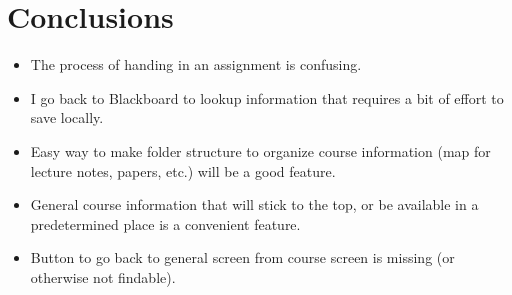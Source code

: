 \section{Conclusions}

\begin{itemize}
	\item The process of handing in an assignment is confusing.
	\item I go back to Blackboard to lookup information that requires a bit of effort to save locally. 
	\item Easy way to make folder structure to organize course information (map for lecture notes, papers, etc.) will be a good feature.
	\item General course information that will stick to the top, or be available in a predetermined place is a convenient feature.
	\item Button to go back to general screen from course screen is missing (or otherwise not findable).
\end{itemize}


\begin{thebibliography}{9}
	
\end{thebibliography}


\appendix



